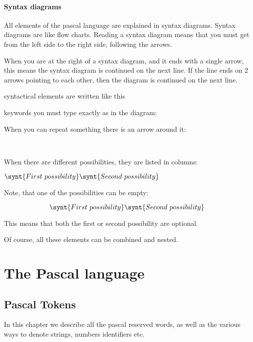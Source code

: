 \documentclass{report}
\begin{document}
\subsection{Syntax diagrams}
All elements of the pascal language are explained in syntax diagrams.
Syntax diagrams are like flow charts. Reading a syntax diagram means that
you must get from the left side to the right side, following the arrows.

When you are at the right of a syntax diagram, and it ends with a single
arrow, this means the syntax diagram is continued on the next line. If
the line ends on 2 arrows pointing to each other, then the diagram is
continued on the next line.

syntactical elements are written like this
\begin{mysyntdiag}
\end{mysyntdiag}
keywords you must type exactly as in the diagram:
\begin{mysyntdiag}
\end{mysyntdiag}
When you can repeat something there is an arrow around it:
\begin{mysyntdiag}
\<[b]  \\ \>
\end{mysyntdiag}
When there are different possibilities, they are listed in columns:
\begin{mysyntdiag}
\( 
\synt{First\ possibility} \\
\synt{Second\ possibility}
\)
\end{mysyntdiag}
Note, that one of the possibilities can be empty:
\begin{mysyntdiag}
\[ 
\synt{First\ possibility} \\
\synt{Second\ possibility}
\]
\end{mysyntdiag}
This means that both the first or second possibility are optional.

Of course, all these elements can be combined and nested.

\part{The Pascal language}

%
%
\chapter{Pascal Tokens}
In this chapter we describe all the pascal reserved words, as well as the
various ways to denote strings, numbers identifiers etc.
\end{document}

